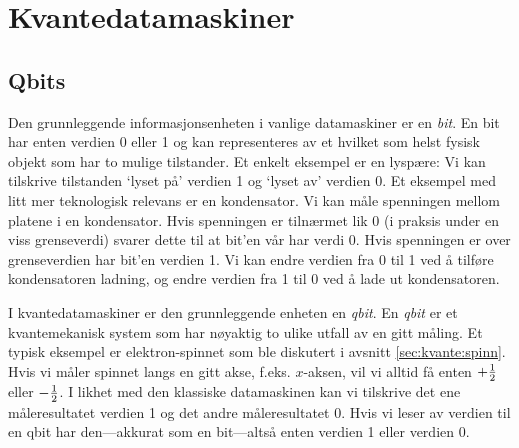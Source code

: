 \chapter{Kvantedatamaskiner}

\section{Qbits}

Den grunnleggende informasjonsenheten i vanlige datamaskiner er en \emph{bit}. En bit har enten verdien 0 eller 1 og kan representeres av et hvilket som helst fysisk objekt som har to mulige tilstander. Et enkelt eksempel er en lyspære: Vi kan tilskrive tilstanden `lyset på' verdien 1 og `lyset av' verdien 0. Et eksempel med litt mer teknologisk relevans er en kondensator. Vi kan måle spenningen mellom platene i en kondensator. Hvis spenningen er tilnærmet lik 0 (i praksis under en viss grenseverdi) svarer dette til at bit'en vår har verdi 0. Hvis spenningen er over grenseverdien har bit'en verdien 1. Vi kan endre verdien fra 0 til 1 ved å tilføre kondensatoren ladning, og endre verdien fra 1 til 0 ved å lade ut kondensatoren.

I kvantedatamaskiner er den grunnleggende enheten en \emph{qbit}. En \emph{qbit} er et kvantemekanisk system som har nøyaktig to ulike utfall av en gitt måling. Et typisk eksempel er elektron-spinnet som ble diskutert i avsnitt \ref{sec:kvante:spinn}. Hvis vi måler spinnet langs en gitt akse, f.eks. $x$-aksen, vil vi alltid få enten $+\frac{1}{2}$ eller $-\frac{1}{2}$. I likhet med den klassiske datamaskinen kan vi tilskrive det ene måleresultatet verdien 1 og det andre måleresultatet 0. Hvis vi leser av verdien til en qbit har den---akkurat som en bit---altså enten verdien 1 eller verdien 0.

